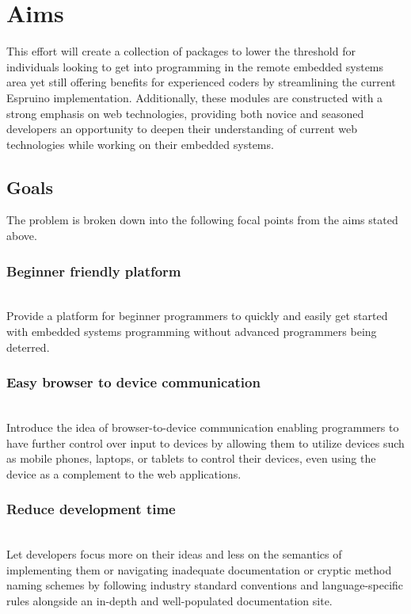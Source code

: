 \documentclass{l4proj}
\begin{document}
\section{Aims}

\text This effort will create a collection of packages to lower the threshold for individuals looking to get into programming in the remote embedded systems area yet still offering benefits for experienced coders by streamlining the current Espruino implementation. Additionally, these modules are constructed with a strong emphasis on web technologies, providing both novice and seasoned developers an opportunity to deepen their understanding of current web technologies while working on their embedded systems.
\subsection{Goals}
\text The problem is broken down into the following focal points from the aims stated above.
\\
\subsubsection{Beginner friendly platform} \hfill\\
\text Provide a platform for beginner programmers to quickly and easily get started with embedded systems programming without advanced programmers being deterred.
\\
\subsubsection{Easy browser to device communication} \hfill\\
\text Introduce the idea of browser-to-device communication enabling programmers to have further control over input to devices by allowing them to utilize devices such as mobile phones, laptops, or tablets to control their devices, even using the device as a complement to the web applications.
\\
\subsubsection{Reduce development time} \hfill\\
\text Let developers focus more on their ideas and less on the semantics of implementing them or navigating inadequate documentation or cryptic method naming schemes by following industry standard conventions and language-specific rules alongside an in-depth and well-populated documentation site.
\\
\end{document}
